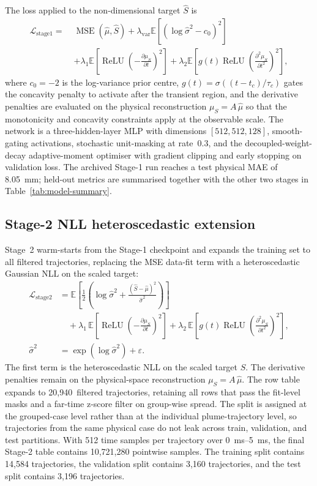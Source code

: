\documentclass[english, 12pt, a4paper, elec, utf8, a-2b, online]{aaltothesis}
\begin{document}
The loss applied to the non-dimensional target $\hat{S}$ is
\[
\begin{aligned}
\mathcal{L}_{\mathrm{stage1}}
=\;&\operatorname{MSE}\!\left(\hat{\mu},\hat{S}\right)
+\lambda_{\mathrm{var}}
\mathbb{E}\!\left[\left(\log \hat{\sigma}^2-c_0\right)^2\right]\\
&+\lambda_{1}
\mathbb{E}\!\left[\operatorname{ReLU}\!\left(-\frac{\partial \mu_S}{\partial t}\right)^2\right]
+\lambda_{2}
\mathbb{E}\!\left[g(t)\operatorname{ReLU}\!\left(\frac{\partial^2 \mu_S}{\partial t^2}\right)^2\right],
\end{aligned}
\]
where $c_0=-2$ is the log-variance prior centre, $g(t)=\sigma((t-t_c)/\tau_c)$ gates the concavity penalty to activate after the transient region, and the derivative penalties are evaluated on the physical reconstruction $\mu_S=A\,\hat{\mu}$ so that the monotonicity and concavity constraints apply at the observable scale. The network is a three-hidden-layer MLP with dimensions $[512,512,128]$, smooth-gating activations, stochastic unit-masking at rate~0.3, and the decoupled-weight-decay adaptive-moment optimiser with gradient clipping and early stopping on validation loss. The archived Stage-1 run reaches a test physical MAE of \SI{8.05}{mm}; held-out metrics are summarised together with the other two stages in Table~\ref{tab:model-summary}.

\subsection{Stage-2 NLL heteroscedastic extension}

Stage~2 warm-starts from the Stage-1 checkpoint and expands the training set to all filtered trajectories, replacing the MSE data-fit term with a heteroscedastic Gaussian NLL on the scaled target:
\[
\begin{aligned}
\mathcal{L}_{\mathrm{stage2}}
&=
\mathbb{E}\!\left[
\frac{1}{2}
\left(
\log \hat{\sigma}^{2}
+\frac{(\hat{S}-\hat{\mu})^{2}}{\hat{\sigma}^{2}}
\right)\right]
\\
&\quad
+\lambda_{1}\,
\mathbb{E}\!\left[
\operatorname{ReLU}\!\left(-\frac{\partial \mu_S}{\partial t}\right)^{2}
\right]
+\lambda_{2}\,
\mathbb{E}\!\left[
g(t)\operatorname{ReLU}\!\left(\frac{\partial^{2}\mu_S}{\partial t^{2}}\right)^{2}
\right],
\\
\hat{\sigma}^{2}
&=\exp(\log\hat{\sigma}^{2})+\varepsilon.
\end{aligned}
\]
The first term is the heteroscedastic NLL on the scaled target $\hat{S}$. The derivative penalties remain on the physical-space reconstruction $\mu_S=A\,\hat{\mu}$. The row table expands to 20{,}940~filtered trajectories, retaining all rows that pass the fit-level masks and a far-time z-score filter on group-wise spread. The split is assigned at the grouped-case level rather than at the individual plume-trajectory level, so trajectories from the same physical case do not leak across train, validation, and test partitions. With 512 time samples per trajectory over \SIrange{0}{5}{ms}, the final Stage-2 table contains 10{,}721{,}280 pointwise samples. The training split contains 14{,}584 trajectories, the validation split contains 3{,}160 trajectories, and the test split contains 3{,}196 trajectories.
\end{document}
